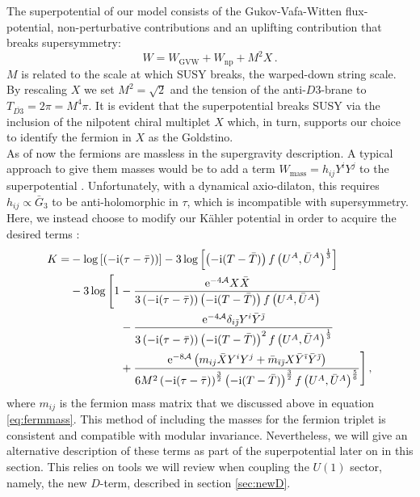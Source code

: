 \documentclass[a4paper,12pt]{report}
\newcommand{\be}{\begin{equation}}
\newcommand{\ee}{\end{equation}}
\newcommand{\bea}{\begin{equation}\begin{aligned}}
\newcommand{\eea}{\end{aligned}\end{equation}}
\def\rmi{{\rm i}}
\def\rme{{\rm e}}
\def\ib{{\bar \imath}}
\def\jb{{\bar \jmath}}
\begin{document}
The superpotential of our model consists of the Gukov-Vafa-Witten flux-potential, non-perturbative contributions and an uplifting contribution that breaks supersymmetry:
\be 
W = W_{\text{GVW}} + W_{\text{np}} + M^2 X\,.
\label{eq:D3barsup}
\ee
$M$ is related to the scale at which SUSY breaks, the warped-down string scale. By rescaling $X$ we set $M^2 = \sqrt{2}$ and the tension of the anti-$D3$-brane to $T_{\overline{D3}} = 2 \pi = M^4 \pi$. It is evident that the superpotential breaks SUSY via the inclusion of the nilpotent chiral multiplet $X$ which, in turn, supports our choice to identify the fermion in $X$ as the Goldstino.\\
As of now the fermions are massless in the supergravity description. A typical approach to give them masses would be to add a term $W_{\text{mass}} = h_{ij}Y^i Y^j$ to the superpotential \cite{Vercnocke:2016fbt,GarciadelMoral:2017vnz}. Unfortunately, with a dynamical axio-dilaton, this requires $h_{ij}\propto \bar{G}_3$ to be anti-holomorphic in $\tau$, which is incompatible with supersymmetry. Here, we instead choose to modify our Kähler potential in order to acquire the desired terms :
\bea 
K = &- \log\left[\left(-\rmi(\tau-\bar{\tau})\right)\right] - 3 \log\left[\left(-\rmi(T-\bar{T})\right)f\left(U^A,\bar{U}^A\right)^{\frac{1}{3}}\right]\\
&- 3\log \Bigg[ 1- \frac{\rme^{-4\mathcal{A}} X\bar{X}}{3\left(-\rmi (\tau-\bar{\tau})\right)\left(-\rmi(T-\bar{T})\right)f\left(U^A,\bar{U}^A\right)}\\
&\qquad \qquad \;\,  - \frac{\rme^{-4\mathcal{A}}\delta_{i\jb}Y^i \bar{Y}^\jb}{3\left(-\rmi (\tau-\bar{\tau})\right)\left(-\rmi(T-\bar{T})\right)^2 f\left(U^A,\bar{U}^A\right)^{\frac{1}{3}}}\\
&\qquad \qquad \;\,  +\frac{\rme^{-8\mathcal{A}}\left( m_{ij} \bar{X} Y^i Y^j + \bar{m}_{\ib\jb}X \bar{Y}^\ib\bar{Y}^\jb\right)}{6 M^2 \left(-\rmi (\tau-\bar{\tau})\right)^\frac{3}{2} \left(-\rmi(T-\bar{T})\right)^{\frac{3}{2}} f\left(U^A,\bar{U}^A\right)^{\frac{5}{6}}}    \Bigg]\,,
\label{eq:Kferm}
\eea
where $m_{ij}$ is the fermion mass matrix that we discussed above in equation \eqref{eq:fermmass}. This method of including the masses for the fermion triplet is consistent and compatible with modular invariance. Nevertheless, we will give an alternative description of these terms as part of the superpotential later on in this section. This relies on tools we will review when coupling the $U(1)$ sector, namely, the new $D$-term, described in section \ref{sec:newD}.
\end{document}
